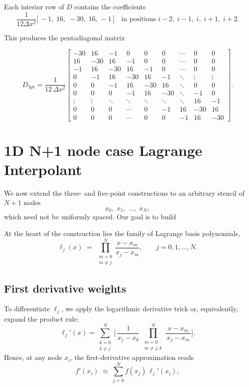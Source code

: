 Each interior row of \(D\) contains the coefficients
\[
\frac{1}{12\Delta x^{2}}
\bigl[\,-1,\;16,\;-30,\;16,\,-1\,\bigr]
\quad\text{in positions } i-2,\;i-1,\;i,\;i+1,\;i+2.
\]

This produces the pentadiagonal matrix

\[
D_{5\text{pt}}
=\frac{1}{12\,\Delta x^{2}}
\begin{bmatrix}
-30 &  16 &  -1 &   0 &   0 &   0 & \cdots &   0 &   0 \\
 16 & -30 &  16 &  -1 &   0 &   0 & \cdots &   0 &   0 \\
 -1 &  16 & -30 &  16 &  -1 &   0 & \cdots &   0 &   0 \\
  0 &  -1 &  16 & -30 &  16 &  -1 & \ddots & \vdots & \vdots \\
  0 &   0 &  -1 &  16 & -30 &  16 & \ddots &   0 &   0 \\
  0 &   0 &   0 &  -1 &  16 & -30 & \ddots &  -1 &   0 \\
\vdots & \vdots & \ddots & \ddots & \ddots & \ddots & \ddots &  16 &  -1 \\
  0 &   0 &   0 & \cdots &   0 &  -1 &  16 & -30 &  16 \\
  0 &   0 &   0 & \cdots &   0 &   0 &  -1 &  16 & -30
\end{bmatrix}.
\]


\newpage

\section{1D N+1 node case Lagrange Interpolant}

We now extend the three- and five-point constructions to an arbitrary stencil of \(N+1\) nodes
\[
x_0,\;x_1,\;\dots,\;x_N,
\]
which need not be uniformly spaced.  Our goal is to build

At the heart of the construction lies the family of Lagrange basis polynomials,
\[
\ell_j(x)
\;=\;
\prod_{\substack{m=0\\m\neq j}}^{N}
\frac{x - x_m}{x_j - x_m},
\qquad j = 0,1,\dots,N.
\]

\subsection{First derivative weights}

To differentiate \(\ell_j\), we apply the logarithmic derivative trick or, equivalently, expand the product rule:
\[
\ell_j'(x)
=
\sum_{\substack{k=0\\k\neq j}}^{N}
\Bigg[\,
\frac{1}{x_j - x_k}
\;\prod_{\substack{m=0\\m\neq j,k}}^{N}
\frac{x - x_m}{\,x_j - x_m\,}
\Bigg].
\]
Hence, at any node \(x_i\), the first-derivative approximation reads
\[
f'(x_i)
\;\approx\;
\sum_{j=0}^N
f(x_j)\,\ell_j'(x_i),
\]

